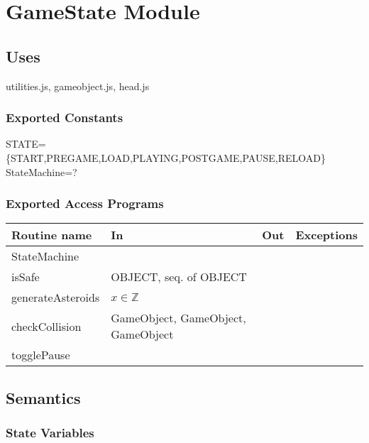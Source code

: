 \documentclass[12pt]{article}
\begin{document}

\newpage

\section*{GameState Module}

\subsection*{Uses}

utilities.js, gameobject.js, head.js\\

\subsubsection*{Exported Constants}

STATE=\{START,PREGAME,LOAD,PLAYING,POSTGAME,PAUSE,RELOAD\}\\
StateMachine=?\\

\subsubsection*{Exported Access Programs}

\begin{tabular}{| l | l | l | l |}
    \hline
    \textbf{Routine name} & \textbf{In} & \textbf{Out} & \textbf{Exceptions}\\
    \hline
    StateMachine &  & ~ & ~\\
    \hline
    isSafe & OBJECT, seq. of OBJECT & ~ & ~\\
    \hline
    generateAsteroids & $x \in \mathbb{Z}$ & ~ & ~ \\
    \hline
    checkCollision & GameObject, GameObject, GameObject & ~ & ~ \\
    \hline
    togglePause & ~ & ~ & ~ \\
    \hline
\end{tabular}

\subsection* {Semantics}

\subsubsection* {State Variables}
\end{document}

